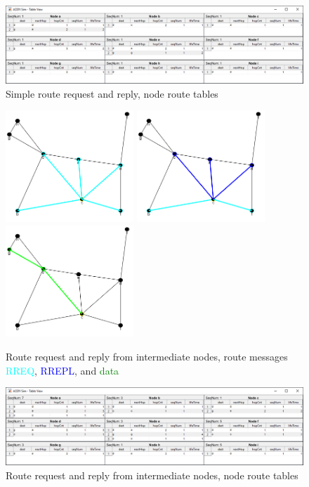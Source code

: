 \documentclass[conference]{IEEEtran}
\begin{document}
\begin{figure}
	\centering
	\includegraphics[width=6.8in]{Ex_1_table.png}
	\caption{Simple route request and reply, node route tables}
	\label{fig:ex_1_table}
\end{figure}

\begin{figure}
	\centering
	\includegraphics[width=1.9in]{Ex_2_request.png}
	\includegraphics[width=1.9in]{Ex_2_reply.png}
	\includegraphics[width=1.9in]{Ex_2_data.png}
	\caption{Route request and reply from intermediate nodes, route messages \protect\textcolor{cyan}{RREQ}, \protect\textcolor{blue}{RREPL}, and \protect\textcolor{green}{data} }
	\label{fig:ex_2}
\end{figure}

\begin{figure}
	\centering
	\includegraphics[width=6.8in]{Ex_2_table.png}
	\caption{Route request and reply from intermediate nodes, node route tables}
	\label{fig:ex_2_table}
\end{figure}
\end{document}

